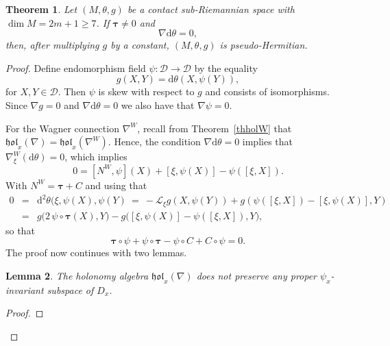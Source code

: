 \documentclass{amsart}
\theoremstyle{plain}
\newtheorem{theorem}{Theorem}[section]
\newtheorem{lem}[theorem]{Lemma}
\theoremstyle{definition}
\newcommand{\hol}{\mathfrak{hol}}
\newcommand{\bt}{{\boldsymbol{\tau}}}
\newcommand{\1}{\mathbf{1}}
\newcommand{\D}{{\mathcal D}}
\renewcommand{\d}{\mathrm{d}}
\renewcommand{\L}{{\mathcal L}}
\newcommand{\+}{\oplus}
\begin{document}




\begin{theorem}\label{dtheta0theo}
 Let $(M,\theta,g)$ be a contact sub-Riemannian space with $\dim M=2m+1\geq 7$. If  $\bt\neq 0$ and $$\nabla\d\theta =0,$$ then, after multiplying $g$ by a constant, 
	 	$(M,\theta,g)$ is pseudo-Hermitian.
	\end{theorem}

\begin{proof}Define endomorphism field $\psi:\D\to \D$  by the equality
\begin{equation}\label{defpsi} g(X,Y)=\d\theta(X,\psi (Y)),\end{equation}
for $X,Y\in \D$. Then $\psi$ is skew with respect to $g$ and consists of isomorphisms. Since $\nabla g=0$ and $\nabla \d\theta=0$ we also have that $\nabla \psi=0$.

For the Wagner connection $\nabla^W$, recall from Theorem~\ref{thholW} that $\hol_x(\nabla)=\hol_x(\nabla^W)$. Hence, the condition $\nabla\d\theta =0$ implies that $\nabla_\xi^W (\d\theta)=0$, which implies
\[ 0=\left[ N^W,\psi\right](X) +[\xi, \psi (X)]-\psi([\xi,X]).\]
With $N^W=\bt+C$ and using that
\begin{eqnarray*}
0&=&\d^2\theta(\xi,\psi(X),\psi(Y)\ =\  -\L_\xi g(X,\psi(Y) )+g(\psi([\xi,X])-[\xi,\psi(X)],Y)
\\
&=&
g\big(2 \,\psi \circ \bt (X),Y\big)
-g\big( [\xi,\psi(X)] - \psi([\xi,X]),Y\big),
\end{eqnarray*}
so that 
\begin{equation}\label{psibtC}
\bt\circ\psi+\psi\circ\bt {-}\psi\circ C{ +}C\circ\psi=0.\end{equation}
The proof now continues with two lemmas.

\begin{lem}\label{psiinv-lem}
 The holonomy algebra $\hol_x(\nabla)$  does not preserve any proper $\psi_x$-invariant subspace of $D_x$.
\end{lem}

\begin{proof} 


\end{proof}
\end{proof}
\end{document}
